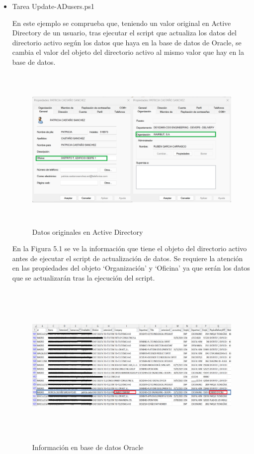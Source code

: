 \documentclass[a4paper, 12pt]{book}
\begin{document}
\begin{itemize}

\item Tarea Update-ADusers.ps1

En este ejemplo se comprueba que, teniendo un valor original en Active Directory de un usuario, tras ejecutar el script que actualiza los datos del directorio activo según los datos que haya en la base de datos de Oracle, se cambia el valor del objeto del directorio activo al mismo valor que hay en la base de datos.

\begin{figure}
	\centering
	\includegraphics[width=15cm, height=8cm, keepaspectratio]{img/image01.png}
	\caption{Datos originales en Active Directory}
	\label{fig:image01}
\end{figure}

En la Figura 5.1 se ve la información que tiene el objeto del directorio activo antes de ejecutar el script de actualización de datos. Se requiere la atención en las propiedades del objeto ‘Organización’ y ‘Oficina’ ya que serán los datos que se actualizarán tras la ejecución del script.

\begin{figure}[h]
	\centering
	\includegraphics[width=15cm, height=8cm, keepaspectratio]{img/image02.png}
	\caption{Información en base de datos Oracle}
	\label{fig:image02}
\end{figure}


\end{itemize}
\end{document}
